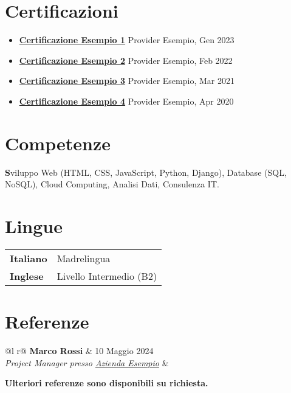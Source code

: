 \documentclass[a4paper,12pt]{article}
\begin{document}
\section{Certificazioni}
\begin{itemize}[leftmargin=*,itemsep=3pt,parsep=0pt]
\item \textbf{\href{https://example.com/cert1}{Certificazione Esempio 1}} \hfill \textnormal{Provider Esempio, Gen 2023}
\item \textbf{\href{https://example.com/cert2}{Certificazione Esempio 2}} \hfill \textnormal{Provider Esempio, Feb 2022}
\item \textbf{\href{https://example.com/cert3}{Certificazione Esempio 3}} \hfill \textnormal{Provider Esempio, Mar 2021}
\item \textbf{\href{https://example.com/cert4}{Certificazione Esempio 4}} \hfill \textnormal{Provider Esempio, Apr 2020}
\end{itemize}

\section{Competenze}
\noindent\textbf Sviluppo Web (HTML, CSS, JavaScript, Python, Django), Database (SQL, NoSQL), Cloud Computing, Analisi Dati, Consulenza IT.

\section{Lingue}
\begin{tabularx}{\linewidth}{@{}l X@{}}
\textbf{Italiano} & Madrelingua \\
\textbf{Inglese} & Livello Intermedio (B2) \\
\end{tabularx}

\section{Referenze}
\begin{tabularx}{\linewidth}{ @{}l r@{} }
\textbf{Marco Rossi} & \hfill 10 Maggio 2024 \\[3.75pt]
\textit{Project Manager presso \href{https://examplecompany.com/}{Azienda Esempio}} & \\[3.75pt]
\end{tabularx}

\vspace{10pt}

\noindent
\textbf{Ulteriori referenze sono disponibili su richiesta.}
\end{document}
